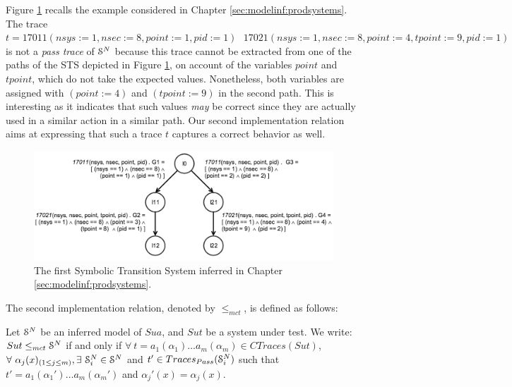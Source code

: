 \begin{example}
    Figure \ref{fig:sts-ch4} recalls the example considered in
    Chapter \ref{sec:modelinf:prodsystems}. The trace $t =
    17011(nsys:=1, nsec:=8, point:=1, pid:=1)\text{ }
    17021(nsys:=1, nsec:=8, point:=4, tpoint:=9, pid:=1)$ is not
    a \emph{pass trace} of $\EuScript{S}^{N}$ because this trace
    cannot be extracted from one of the paths of the STS depicted
    in Figure \ref{fig:sts-ch4}, on account of the variables
    $point$ and $tpoint$, which do not take the expected values.
    Nonetheless, both variables are assigned with $(point := 4)$
    and $(tpoint := 9)$ in the second path. This is interesting
    as it indicates that such values \emph{may} be correct since
    they are actually used in a similar action in a similar path.
    Our second implementation relation aims at expressing that
    such a trace $t$ captures a correct behavior as well.

    \begin{figure}[ht]
        \begin{center}
            \includegraphics[width=1.0\linewidth]{figures/STS1.png}
        \end{center}

        \caption{The first Symbolic Transition System inferred in
        Chapter \ref{sec:modelinf:prodsystems}.}
        \label{fig:sts-ch4}
    \end{figure}
\end{example}

The second implementation relation, denoted by $\leq_{mct}$, is
defined as follows:

\begin{definition}
     Let $\EuScript{S}^{N}$ be an inferred model of
     $\mathit{Sua}$, and $\mathit{Sut}$ be a system under test.
     We write: ${Sut} \leq_{mct} \EuScript{S}^{N}$ if and only if
     $\forall ~t= a_1(\alpha_1) \dots a_m(\alpha_m) \in
     CTraces({Sut})$, $\forall ~\alpha_j(x)_{(1 \leq j \leq m)},
     \exists ~\EuScript{S}_i^{N} \in \EuScript{S}^{N}$ and $t'
     \in Traces_{Pass}(\EuScript{S}_i^{N})$ such that
     $t'=a_1(\alpha_1') \dots a_m(\alpha_m')$ and
     $\alpha_j'(x)=\alpha_j(x)$.

     \label{impl21}
\end{definition}

